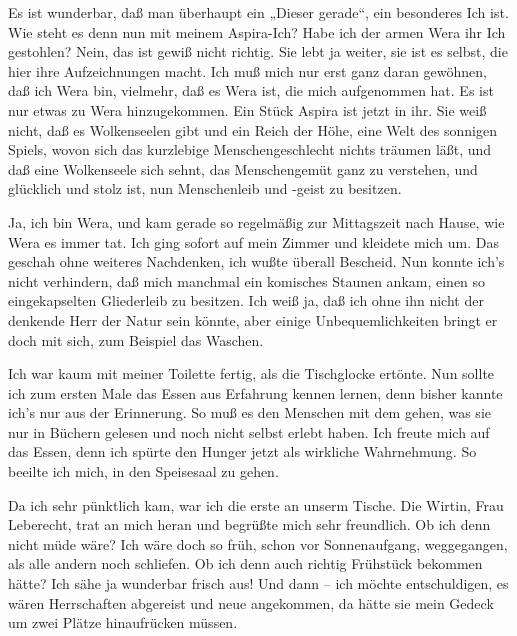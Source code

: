 Es ist wunderbar, daß man überhaupt ein „Dieser gerade“, ein
besonderes Ich ist. Wie steht es denn nun mit meinem Aspira-Ich?
Habe ich der armen Wera ihr Ich gestohlen? Nein, das ist gewiß
nicht richtig. Sie lebt ja weiter, sie ist es selbst, die hier ihre
Aufzeichnungen macht. Ich muß mich nur erst ganz daran gewöhnen,
daß ich Wera bin, vielmehr, daß es Wera ist, die mich aufgenommen
hat. Es ist nur etwas zu Wera hinzugekommen. Ein Stück Aspira ist
jetzt in ihr. Sie weiß nicht, daß es Wolkenseelen gibt und ein
Reich der Höhe, eine Welt des sonnigen Spiels, wovon sich das
kurzlebige Menschengeschlecht nichts träumen läßt, und daß eine
Wolkenseele sich sehnt, das Menschengemüt ganz zu verstehen, und
glücklich und stolz ist, nun Menschenleib und -geist zu besitzen.

Ja, ich bin Wera, und kam gerade so regelmäßig zur Mittagszeit nach
Hause, wie Wera es immer tat. Ich ging sofort auf mein Zimmer und
kleidete mich um. Das geschah ohne weiteres Nachdenken, ich wußte
überall Bescheid. Nun konnte ich's nicht verhindern, daß mich
manchmal ein komisches Staunen ankam, einen so eingekapselten
Gliederleib zu besitzen. Ich weiß ja, daß ich ohne ihn nicht der
denkende Herr der Natur sein könnte, aber einige Unbequemlichkeiten
bringt er doch mit sich, zum Beispiel das Waschen.

Ich war kaum mit meiner Toilette fertig, als die Tischglocke
ertönte. Nun sollte ich zum ersten Male das Essen aus Erfahrung
kennen lernen, denn bisher kannte ich's nur aus der Erinnerung. So
muß es den Menschen mit dem gehen, was sie nur in Büchern gelesen
und noch nicht selbst erlebt haben. Ich freute mich auf das Essen,
denn ich spürte den Hunger jetzt als wirkliche Wahrnehmung. So
beeilte ich mich, in den Speisesaal zu gehen.

Da ich sehr pünktlich kam, war ich die erste an unserm Tische. Die
Wirtin, Frau Leberecht, trat an mich heran und begrüßte mich sehr
freundlich. Ob ich denn nicht müde wäre? Ich wäre doch so früh,
schon vor Sonnenaufgang, weggegangen, als alle andern noch
schliefen. Ob ich denn auch richtig Frühstück bekommen hätte? Ich
sähe ja wunderbar frisch aus! Und dann – ich möchte entschuldigen,
es wären Herrschaften abgereist und neue angekommen, da hätte sie
mein Gedeck um zwei Plätze hinaufrücken müssen.

